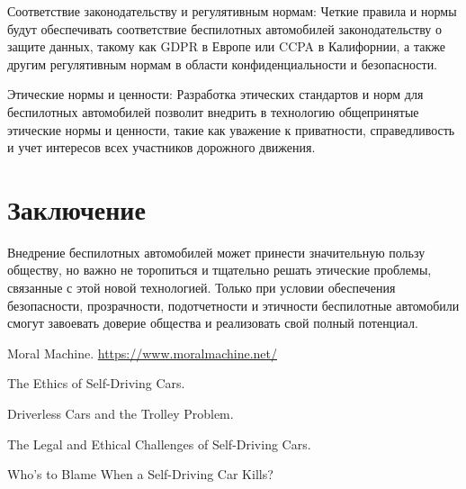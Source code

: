 \documentclass{article}
\begin{document}
\begin{itemize}
\begin{itemize}
        Соответствие законодательству и регулятивным нормам: Четкие правила и нормы будут обеспечивать соответствие беспилотных автомобилей законодательству о защите данных, такому как GDPR в Европе или CCPA в Калифорнии, а также другим регулятивным нормам в области конфиденциальности и безопасности.

        Этические нормы и ценности: Разработка этических стандартов и норм для беспилотных автомобилей позволит внедрить в технологию общепринятые этические нормы и ценности, такие как уважение к приватности, справедливость и учет интересов всех участников дорожного движения.
    \end{itemize}
\end{itemize}


\section{Заключение}

Внедрение беспилотных автомобилей может принести значительную пользу обществу, но важно не торопиться и тщательно решать этические проблемы, связанные с этой новой технологией. Только при условии обеспечения безопасности, прозрачности, подотчетности и этичности беспилотные автомобили смогут завоевать доверие общества и реализовать свой полный потенциал.



\begin{thebibliography}{9}

    Moral Machine. \url{https://www.moralmachine.net/}
    
    The Ethics of Self-Driving Cars.
    
    Driverless Cars and the Trolley Problem.
    
    The Legal and Ethical Challenges of Self-Driving Cars.
    
    Who's to Blame When a Self-Driving Car Kills?
    
    \end{thebibliography}
\end{document}
